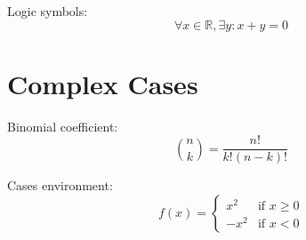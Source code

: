 \documentclass{article}
\begin{document}
Logic symbols:
\begin{equation}
\forall x \in \mathbb{R}, \exists y : x + y = 0
\end{equation}

\section{Complex Cases}
Binomial coefficient:
\begin{equation}
\binom{n}{k} = \frac{n!}{k!(n-k)!}
\end{equation}

Cases environment:
\begin{equation}
f(x) = \begin{cases}
x^2 & \text{if } x \geq 0 \\
-x^2 & \text{if } x < 0
\end{cases}
\end{equation}
\end{document}
